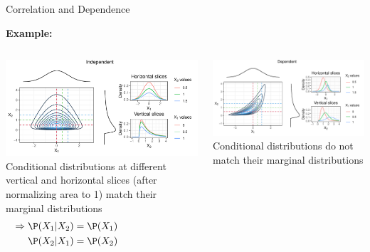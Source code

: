 \documentclass[11pt,compress,t,notes=noshow, aspectratio=169, xcolor=table]{beamer}
\begin{document}
\begin{frame}{Correlation and Dependence}
	
\textbf{Example:}
\begin{columns}[T, totalwidth=\linewidth]
\begin{column}{0.49\linewidth}
\includegraphics[width=\linewidth]{figure/independent_slice.pdf}
Conditional distributions at different vertical and horizontal slices (after normalizing area to 1) match their marginal distributions
\begin{align*}
    \Rightarrow \P(X_1|X_2) &= \P(X_1) \hspace{2.5cm} \\ 
    \P(X_2|X_1) &= \P(X_2)
\end{align*}
\end{column}
\hfill\pause
\begin{column}{0.49\linewidth}
\includegraphics[width=\linewidth]{figure/dependent_slice.pdf}
Conditional distributions do not match their marginal distributions
\end{column}
\end{columns}


\end{frame}
\end{document}
